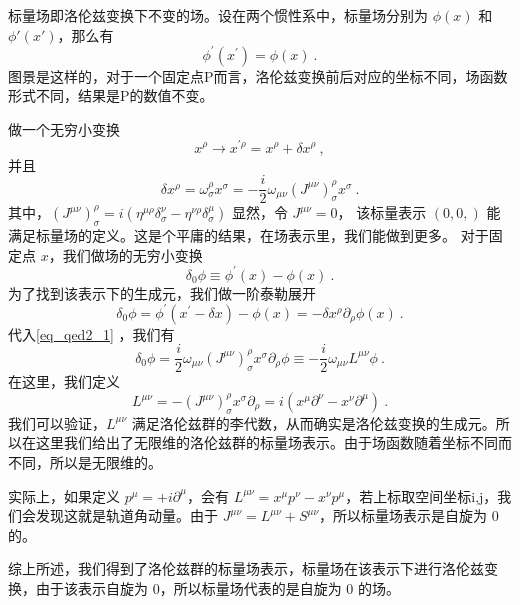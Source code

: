 \begin{definition}{}
标量场即洛伦兹变换下不变的场。设在两个惯性系中，标量场分别为 $\phi(x)$ 和 $\phi'(x')$，那么有
\begin{equation}
\phi^{\prime}\left(x^{\prime}\right)=\phi(x)~.
\end{equation}
图景是这样的，对于一个固定点P而言，洛伦兹变换前后对应的坐标不同，场函数形式不同，结果是P的数值不变。
\end{definition}
\begin{corollary}{}
做一个无穷小变换
\begin{equation}
x^{\rho} \rightarrow x^{\prime \rho}=x^{\rho}+\delta x^{\rho}~,
\end{equation}
并且
\begin{equation}\label{eq_qed2_1}
\delta x^{\rho}=\omega_{\sigma}^{\rho} x^{\sigma}=-\frac{i}{2} \omega_{\mu \nu}\left(J^{\mu \nu}\right)_{\sigma}^{\rho} x^{\sigma}~.
\end{equation}
其中，$\left(J^{\mu \nu}\right)_{\sigma}^{\rho}=i\left(\eta^{\mu \rho} \delta_{\sigma}^{\nu}-\eta^{\nu \rho} \delta_{\sigma}^{\mu}\right)$
显然，令 $J^{\mu \nu}=0$， 该标量表示 $(0,0,)$ 能满足标量场的定义。这是个平庸的结果，在场表示里，我们能做到更多。 对于固定点 $x$，我们做场的无穷小变换
\begin{equation}
\delta_{0} \phi \equiv \phi^{\prime}(x)-\phi(x)~.
\end{equation}
为了找到该表示下的生成元，我们做一阶泰勒展开
\begin{equation}
\delta_{0} \phi=\phi^{\prime}\left(x^{\prime}-\delta x\right)-\phi(x)=-\delta x^{\rho} \partial_{\rho} \phi(x)~.
\end{equation}
代入\autoref{eq_qed2_1} ，我们有
\begin{equation}
\delta_{0} \phi=\frac{i}{2} \omega_{\mu \nu}\left(J^{\mu \nu}\right)_{\sigma}^{\rho} x^{\sigma} \partial_{\rho} \phi \equiv-\frac{i}{2} \omega_{\mu \nu} L^{\mu \nu} \phi~.
\end{equation}
在这里，我们定义
\begin{equation}
L^{\mu \nu}=-\left(J^{\mu \nu}\right)_{\sigma}^{\rho} x^{\sigma} \partial_{\rho}=i\left(x^{\mu} \partial^{\nu}-x^{\nu} \partial^{\mu}\right)~.
\end{equation}
我们可以验证，$L^{\mu \nu}$ 满足洛伦兹群的李代数，从而确实是洛伦兹变换的生成元。所以在这里我们给出了无限维的洛伦兹群的标量场表示。由于场函数随着坐标不同而不同，所以是无限维的。

实际上，如果定义 $p^{\mu}=+i \partial^{\mu}$，会有 $L^{\mu \nu}=x^{\mu} p^{\nu}-x^{\nu} p^{\mu}$，若上标取空间坐标i,j，我们会发现这就是轨道角动量。由于 $J^{\mu \nu}=L^{\mu \nu}+S^{\mu \nu}$，所以标量场表示是自旋为 0 的。

综上所述，我们得到了洛伦兹群的标量场表示，标量场在该表示下进行洛伦兹变换，由于该表示自旋为 0，所以标量场代表的是自旋为 0 的场。
\end{corollary}

